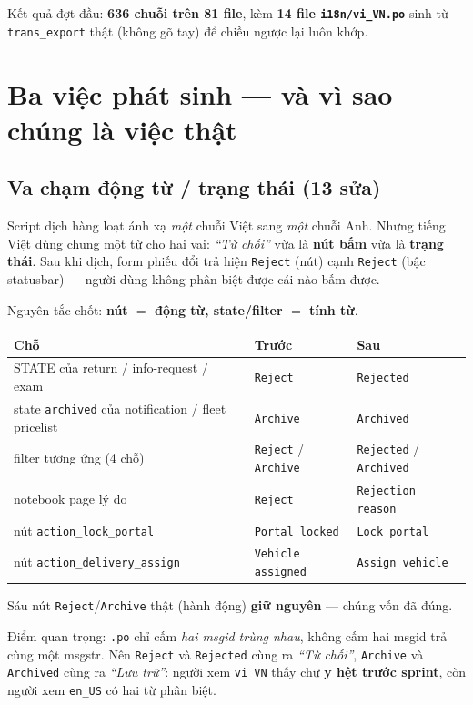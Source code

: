 Kết quả đợt đầu: \textbf{636 chuỗi trên 81 file}, kèm \textbf{14 file \texttt{i18n/vi\_VN.po}} sinh
từ \texttt{trans\_export} thật (không gõ tay) để chiều ngược lại luôn khớp.

\section{Ba việc phát sinh --- và vì sao chúng là việc thật}

\subsection{Va chạm động từ / trạng thái (13 sửa)}

Script dịch hàng loạt ánh xạ \emph{một} chuỗi Việt sang \emph{một} chuỗi Anh. Nhưng tiếng Việt dùng
chung một từ cho hai vai: \emph{``Từ chối''} vừa là \textbf{nút bấm} vừa là \textbf{trạng thái}. Sau
khi dịch, form phiếu đổi trả hiện \texttt{Reject} (nút) cạnh \texttt{Reject} (bậc statusbar) ---
người dùng không phân biệt được cái nào bấm được.

Nguyên tắc chốt: \textbf{nút $=$ động từ, state/filter $=$ tính từ}.

\begin{center}
\begin{tabular}{p{5.6cm}p{3.4cm}p{4.4cm}}
\hline
\textbf{Chỗ} & \textbf{Trước} & \textbf{Sau} \\
\hline
STATE của return / info-request / exam & \texttt{Reject} & \texttt{Rejected} \\
state \texttt{archived} của notification / fleet pricelist & \texttt{Archive} & \texttt{Archived} \\
filter tương ứng (4 chỗ) & \texttt{Reject} / \texttt{Archive} & \texttt{Rejected} / \texttt{Archived} \\
notebook page lý do & \texttt{Reject} & \texttt{Rejection reason} \\
nút \texttt{action\_lock\_portal} & \texttt{Portal locked} & \texttt{Lock portal} \\
nút \texttt{action\_delivery\_assign} & \texttt{Vehicle assigned} & \texttt{Assign vehicle} \\
\hline
\end{tabular}
\end{center}

Sáu nút \texttt{Reject}/\texttt{Archive} thật (hành động) \textbf{giữ nguyên} --- chúng vốn đã đúng.

Điểm quan trọng: \texttt{.po} chỉ cấm \emph{hai msgid trùng nhau}, không cấm hai msgid trả cùng một
msgstr. Nên \texttt{Reject} và \texttt{Rejected} cùng ra \emph{``Từ chối''}, \texttt{Archive} và
\texttt{Archived} cùng ra \emph{``Lưu trữ''}: người xem \texttt{vi\_VN} thấy chữ \textbf{y hệt trước
sprint}, còn người xem \texttt{en\_US} có hai từ phân biệt.

